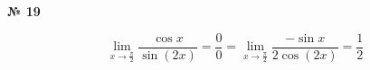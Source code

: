 \documentclass{article}
\begin{document}
\textbf{№ 19} 

\begingroup
\Large

$$ \lim\limits_{x \to \frac{\pi}{2}} \frac{\cos{x}}{\sin{(2x)}}
= \frac{0}{0}
= \lim\limits_{x \to \frac{\pi}{2}} \frac{-\sin{x}}{2\cos{(2x)}} 
= \frac{1}{2} $$

\endgroup
\end{document}
